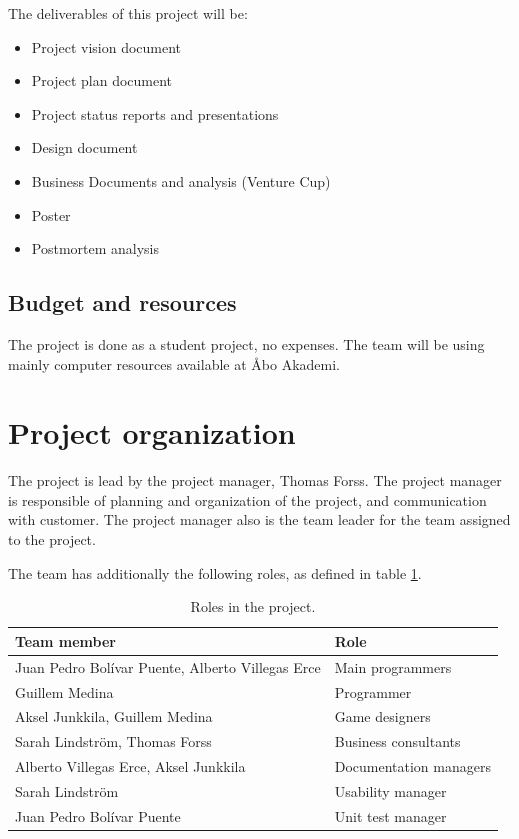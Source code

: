 \documentclass[12pt,a4paper]{article}
\begin{document}
The deliverables of this project will be:

\begin{itemize}
\item Project vision document
\item Project plan document
\item Project status reports and presentations
\item Design document
\item Business Documents and analysis (Venture Cup)
\item Poster
\item Postmortem analysis
\end{itemize}

\subsection{Budget and resources}

The project is done as a student project, no expenses. The team will
be using mainly computer resources available at Åbo Akademi.


\section{Project organization}

The project is lead by the project manager, Thomas Forss. The project
manager is responsible of planning and organization of the project,
and communication with customer. The project manager also is the team
leader for the team assigned to the project.

The team has additionally the following roles, as defined in table
\ref{tab:roles}.

\begin{table}[h!]
\small
\begin{tabular}{l|l}
Team member                                      &Role \\\hline\hline
Juan Pedro Bolívar Puente, Alberto Villegas Erce &Main programmers\\
Guillem Medina 					 &Programmer\\
Aksel Junkkila, Guillem Medina			 &Game designers\\		
Sarah Lindström, Thomas Forss			 &Business consultants\\
Alberto Villegas Erce, Aksel Junkkila		 &Documentation managers\\
Sarah Lindström					 &Usability manager\\
Juan Pedro Bolívar Puente			 &Unit test manager\\
\end{tabular}
\caption{Roles in the project.}
\label{tab:roles}
\end{table}
\end{document}
